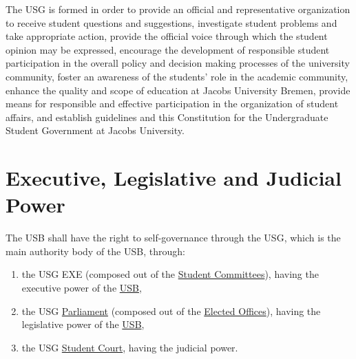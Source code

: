 The \ac{USG}\label{USGdef} is formed in order to provide an official and representative organization to receive student questions and suggestions, investigate student problems and take appropriate action, provide the official voice through which the student opinion may be expressed, encourage the development of responsible student participation in the overall policy and decision making processes of the university community, foster an awareness of the students' role in the academic community, enhance the quality and scope of education at Jacobs University Bremen, provide means for responsible and effective participation in the organization of student affairs, and establish guidelines and this Constitution for the Undergraduate Student Government at Jacobs University.


\section{Executive, Legislative and Judicial Power} 
The \acf{USB}\label{USBdef} shall have the right to self-governance through the \acf{USG}, which is the main authority body of the USB, through:
\begin{enumerate}
    \item the USG \acl{EXE} (composed out of the \hyperref[USGstructure]{Student Committees}), having the executive power of the \hyperref[studentbody]{USB},
    \item the USG \hyperref[USGParliamentDef]{Parliament} \label{USGParliament} (composed out of the \hyperref[ElectedOfficesDef]{Elected Offices}), having the legislative power of the \hyperref[studentbody]{USB},
    \item the USG \hyperref[StudentCourtDef]{Student Court}, having the judicial power.
\end{enumerate}



